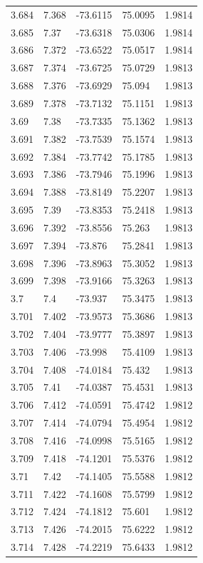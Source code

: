\begin{tabular}{lllll}
3.684 & 7.368 & -73.6115 & 75.0095 & 1.9814 \\
3.685 & 7.37 & -73.6318 & 75.0306 & 1.9814 \\
3.686 & 7.372 & -73.6522 & 75.0517 & 1.9814 \\
3.687 & 7.374 & -73.6725 & 75.0729 & 1.9813 \\
3.688 & 7.376 & -73.6929 & 75.094 & 1.9813 \\
3.689 & 7.378 & -73.7132 & 75.1151 & 1.9813 \\
3.69 & 7.38 & -73.7335 & 75.1362 & 1.9813 \\
3.691 & 7.382 & -73.7539 & 75.1574 & 1.9813 \\
3.692 & 7.384 & -73.7742 & 75.1785 & 1.9813 \\
3.693 & 7.386 & -73.7946 & 75.1996 & 1.9813 \\
3.694 & 7.388 & -73.8149 & 75.2207 & 1.9813 \\
3.695 & 7.39 & -73.8353 & 75.2418 & 1.9813 \\
3.696 & 7.392 & -73.8556 & 75.263 & 1.9813 \\
3.697 & 7.394 & -73.876 & 75.2841 & 1.9813 \\
3.698 & 7.396 & -73.8963 & 75.3052 & 1.9813 \\
3.699 & 7.398 & -73.9166 & 75.3263 & 1.9813 \\
3.7 & 7.4 & -73.937 & 75.3475 & 1.9813 \\
3.701 & 7.402 & -73.9573 & 75.3686 & 1.9813 \\
3.702 & 7.404 & -73.9777 & 75.3897 & 1.9813 \\
3.703 & 7.406 & -73.998 & 75.4109 & 1.9813 \\
3.704 & 7.408 & -74.0184 & 75.432 & 1.9813 \\
3.705 & 7.41 & -74.0387 & 75.4531 & 1.9813 \\
3.706 & 7.412 & -74.0591 & 75.4742 & 1.9812 \\
3.707 & 7.414 & -74.0794 & 75.4954 & 1.9812 \\
3.708 & 7.416 & -74.0998 & 75.5165 & 1.9812 \\
3.709 & 7.418 & -74.1201 & 75.5376 & 1.9812 \\
3.71 & 7.42 & -74.1405 & 75.5588 & 1.9812 \\
3.711 & 7.422 & -74.1608 & 75.5799 & 1.9812 \\
3.712 & 7.424 & -74.1812 & 75.601 & 1.9812 \\
3.713 & 7.426 & -74.2015 & 75.6222 & 1.9812 \\
3.714 & 7.428 & -74.2219 & 75.6433 & 1.9812 \\

\end{tabular}
